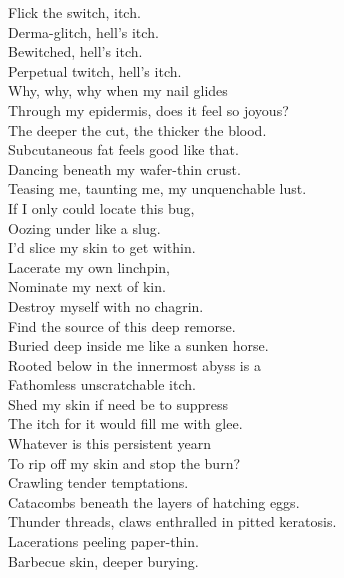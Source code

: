 
Flick the switch,  itch. \\
Derma-glitch, hell's itch. \\
Bewitched, hell's itch. \\
Perpetual twitch, hell's itch. \\

Why, why, why when my nail glides \\
Through my epidermis, does it feel so joyous? \\
The deeper the cut, the thicker the blood. \\
Subcutaneous fat feels good like that. \\

Dancing beneath my wafer-thin crust. \\
Teasing me, taunting me, my unquenchable lust. \\
If I only could locate this bug, \\
Oozing under like a slug. \\

I'd slice my skin to get within. \\
Lacerate my own linchpin, \\
Nominate my next of kin. \\
Destroy myself with no chagrin. \\

Find the source of this deep remorse. \\
Buried deep inside me like a sunken horse. \\
Rooted below in the innermost abyss is a \\
Fathomless unscratchable itch. \\

Shed my skin if need be to suppress \\
The itch for it would fill me with glee. \\
Whatever is this persistent yearn \\
To rip off my skin and stop the burn? \\

Crawling tender temptations. \\
Catacombs beneath the layers of hatching eggs. \\
Thunder threads, claws enthralled in pitted keratosis. \\
Lacerations peeling paper-thin. \\
Barbecue skin, deeper burying. \\

